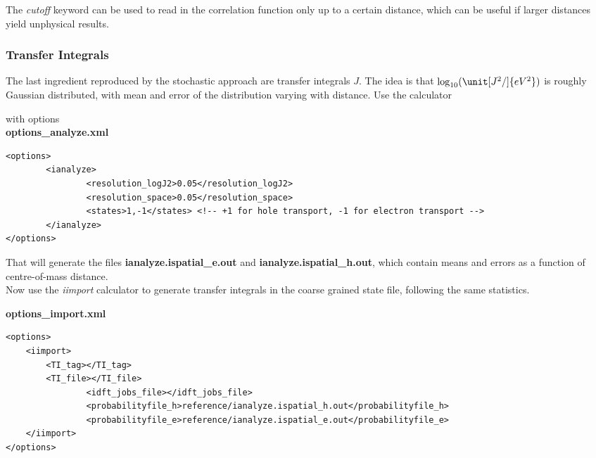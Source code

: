 The \emph{cutoff} keyword can be used to read in the correlation function only up to a certain distance, which can be useful if larger distances yield unphysical results.

\subsubsection{Transfer Integrals}

The last ingredient reproduced by the stochastic approach are transfer integrals $J$. The idea is that $\log_{10}(\unit[J^2/]{eV^2})$ is roughly Gaussian distributed, with mean and error of the distribution varying with distance. Use the calculator\\

with options\\

\textbf{options\_analyze.xml}

\lstset{language=XML}
\begin{lstlisting}
<options>
        <ianalyze>
                <resolution_logJ2>0.05</resolution_logJ2>
                <resolution_space>0.05</resolution_space>
                <states>1,-1</states> <!-- +1 for hole transport, -1 for electron transport -->
        </ianalyze>
</options>
\end{lstlisting}

That will generate the files \textbf{ianalyze.ispatial\_e.out} and \textbf{ianalyze.ispatial\_h.out}, which contain means and errors as a function of centre-of-mass distance.\\

Now use the \emph{iimport} calculator to generate transfer integrals in the coarse grained state file, following the same statistics.



\textbf{options\_import.xml}

\lstset{language=XML}
\begin{lstlisting}
<options>
	<iimport>
		<TI_tag></TI_tag>
		<TI_file></TI_file>
                <idft_jobs_file></idft_jobs_file>
                <probabilityfile_h>reference/ianalyze.ispatial_h.out</probabilityfile_h>
                <probabilityfile_e>reference/ianalyze.ispatial_e.out</probabilityfile_e>
	</iimport>
</options>
\end{lstlisting}

